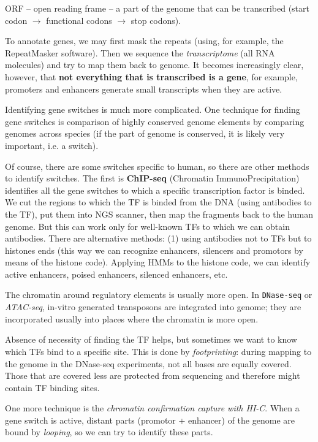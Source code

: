 \documentclass[main.tex]{subfiles}
\begin{document}
\begin{leftbar}
    ORF -- open reading frame -- a part of the genome that can be transcribed (start codon $ \rightarrow $ functional codons $ \rightarrow $ stop codons).
\end{leftbar}

To annotate genes, we may first mask the repeats (using, for example, the RepeatMasker software).
Then we sequence the \emph{transcriptome} (all RNA molecules) and try to map them back to genome. It becomes increasingly clear, however, that \textbf{not everything that is transcribed is a gene}, for example, promoters and enhancers generate small transcripts when they are active.

Identifying gene switches is much more complicated.
One technique for finding gene switches is comparison of highly conserved genome elements by comparing genomes across species (if the part of genome is conserved, it is likely very important, i.e. a switch).

Of course, there are some switches specific to human, so there are other methods to identify switches.
The first is \textbf{ChIP-seq} (Chromatin ImmunoPrecipitation) identifies all the gene switches to which a specific transcription factor is binded.
We cut the regions to which the TF is binded from the DNA (using antibodies to the TF), put them into NGS scanner, then map the fragments back to the human genome.
But this can work only for well-known TFs to which we can obtain antibodies.
There are alternative methods: (1) using antibodies not to TFs but to histones ends (this way we can recognize enhancers, silencers and promotors by means of the histone code). Applying HMMs to the histone code, we can identify active enhancers, poised enhancers, silenced enhancers, etc.

The chromatin around regulatory elements is usually more open. In \texttt{DNase-seq} or \emph{ATAC-seq}, in-vitro generated transposons are integrated into genome; they are incorporated usually into places where the chromatin is more open.

Absence of necessity of finding the TF helps, but sometimes we want to know which TFs bind to a specific site.
This is done by \emph{footprinting}: during mapping to the genome in the DNase-seq experiments, not all bases are equally covered.
Those that are covered less are protected from sequencing and therefore might contain TF binding sites.

One more technique is the \emph{chromatin confirmation capture with HI-C}.
When a gene switch is active, distant parts (promotor + enhancer) of the genome are bound by \emph{looping}, so we can try to identify these parts.
\end{document}
